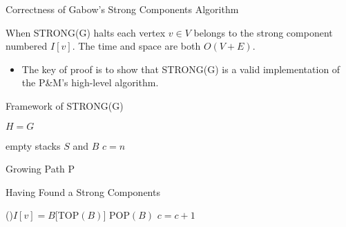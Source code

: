 \documentclass{beamer}
\begin{document}
\begin{frame}{Correctness of Gabow's Strong Components Algorithm}
	\begin{theorem}
		When STRONG(G) halts each vertex $v\in V$ belongs to the strong component numbered $I[v]$.
		The time and space are both $O(V+E)$.
	\end{theorem}
	\begin{itemize}
		\item
		The key of proof is to show that STRONG(G) is a valid implementation of the P\&M's high-level algorithm.
	\end{itemize}
\end{frame}

\begin{frame}{Framework of STRONG(G)}
	\SetAlFnt{\small}
	\begin{algorithm}[H]
		\caption{Strong components: Main-DFS(G) (DFS caller)}
		$H=G$\;
	\end{algorithm}
	\begin{procedure}[H]
		\caption{STRONG(G)}
		empty stacks $S$ and $B$\;
		$c=n$\;
	\end{procedure}
\end{frame}

\begin{frame}{Growing Path P}
	\SetAlFnt{\small}
	\begin{algorithm}[H]
		\caption{A Part of High-Level Algorithm}
	\end{algorithm}
	\begin{procedure}[H]
		\caption{A Part of DFS(v)}
	\end{procedure}
\end{frame}

\begin{frame}{Having Found a Strong Components}
	\SetAlFnt{\small}
	\begin{algorithm}[H]
		\caption{A Part of High-Level Algorithm}
	\end{algorithm}
	\begin{procedure}[H]
		\caption{A Part of DFS(v)}
		\If(){$I[v]=B[$TOP$(B)]$} {
			POP$(B)$\;
			$c = c + 1$\;
		}
	\end{procedure}
\end{frame}
\end{document}
